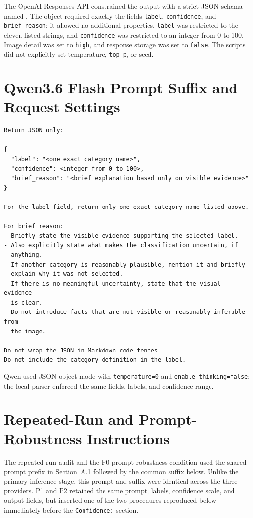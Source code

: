 The OpenAI Responses API constrained the output with a strict JSON schema
named . The object required exactly the
fields \texttt{label}, \texttt{confidence}, and \texttt{brief\_reason}; it
allowed no additional properties. \texttt{label} was restricted to the eleven
listed strings, and \texttt{confidence} was restricted to an integer from 0
to 100. Image detail was set to \texttt{high}, and response storage was set to
\texttt{false}. The scripts did not explicitly set temperature,
\texttt{top\_p}, or seed.

\section{Qwen3.6 Flash Prompt Suffix and Request Settings}

\begin{lstlisting}
Return JSON only:

{
  "label": "<one exact category name>",
  "confidence": <integer from 0 to 100>,
  "brief_reason": "<brief explanation based only on visible evidence>"
}

For the label field, return only one exact category name listed above.

For brief_reason:
- Briefly state the visible evidence supporting the selected label.
- Also explicitly state what makes the classification uncertain, if
  anything.
- If another category is reasonably plausible, mention it and briefly
  explain why it was not selected.
- If there is no meaningful uncertainty, state that the visual evidence
  is clear.
- Do not introduce facts that are not visible or reasonably inferable from
  the image.

Do not wrap the JSON in Markdown code fences.
Do not include the category definition in the label.
\end{lstlisting}

\enlargethispage{2\baselineskip}
Qwen used JSON-object mode with \texttt{temperature=0} and
\texttt{enable\_thinking=false}; the local parser enforced the same fields,
labels, and confidence range.


\section{Repeated-Run and Prompt-Robustness Instructions}
\label{app:repeat_prompt}

The repeated-run audit and the P0 prompt-robustness condition used the shared
prompt prefix in Section~A.1 followed by the common suffix below. Unlike the
primary inference stage, this prompt and suffix were identical across the
three providers. P1 and P2 retained the same prompt, labels, confidence scale,
and output fields, but inserted one of the two procedures reproduced below
immediately before the \texttt{Confidence:} section.


